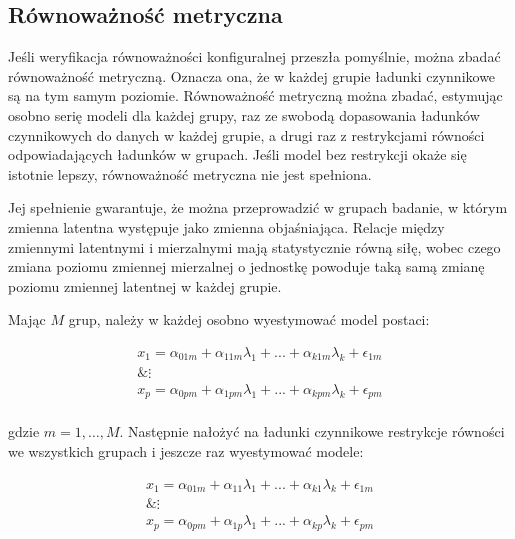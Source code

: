 \documentclass[12pt]{article}
\begin{document}
\hypertarget{ruxf3wnowaux17cnoux15bux107-metryczna}{%
\subsection{Równoważność metryczna}\label{ruxf3wnowaux17cnoux15bux107-metryczna}}

Jeśli weryfikacja równoważności konfiguralnej przeszła pomyślnie, można zbadać równoważność metryczną. Oznacza ona, że w każdej grupie ładunki czynnikowe są na tym samym poziomie. Równoważność metryczną można zbadać, estymując osobno serię modeli dla każdej grupy, raz ze swobodą dopasowania ładunków czynnikowych do danych w każdej grupie, a drugi raz z restrykcjami równości odpowiadających ładunków w grupach. Jeśli model bez restrykcji okaże się istotnie lepszy, równoważność metryczna nie jest spełniona.

Jej spełnienie gwarantuje, że można przeprowadzić w grupach badanie, w którym zmienna latentna występuje jako zmienna objaśniająca. Relacje między zmiennymi latentnymi i mierzalnymi mają statystycznie równą siłę, wobec czego zmiana poziomu zmiennej mierzalnej o jednostkę powoduje taką samą zmianę poziomu zmiennej latentnej w każdej grupie.

Mając \(M\) grup, należy w każdej osobno wyestymować model postaci:

\begin{equation}
\label{eq:group-model}
\begin{aligned} 
x_1 = \alpha_{01m} + \alpha_{11m} \lambda_1 + ... + \alpha_{k1m} \lambda_k + \epsilon_{1m}\\
\& \vdots \\
x_p = \alpha_{0pm} + \alpha_{1pm} \lambda_1 + ... + \alpha_{kpm} \lambda_k + \epsilon_{pm}\\
\end{aligned}
\end{equation}

gdzie \(m = 1, …, M\). Następnie nałożyć na ładunki czynnikowe restrykcje równości we wszystkich grupach i jeszcze raz wyestymować modele:

\begin{equation}
\label{eq:restricted-loadings}
\begin{aligned} 
x_1 = \alpha_{01m} + \alpha_{11} \lambda_1 + ... + \alpha_{k1} \lambda_k + \epsilon_{1m}\\
\& \vdots \\
x_p = \alpha_{0pm} + \alpha_{1p} \lambda_1 + ... + \alpha_{kp} \lambda_k + \epsilon_{pm}\\
\end{aligned}
\end{equation}
\end{document}
